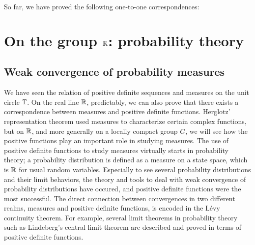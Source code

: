 \documentclass[12pt]{article}
\begin{document}
So far, we have proved the following one-to-one correspondences:
\begin{figure}[h]
\end{figure}










\newpage
\section{On the group $\mathbb{R}$: probability theory}

\subsection{Weak convergence of probability measures}

We have seen the relation of positive definite sequences and measures on the unit circle $\mathbb{T}$.
On the real line $\mathbb{R}$, predictably, we can also prove that there exists a correspondence between measures and positive definite functions.
Herglotz' representation theorem used measures to characterize certain complex functions, but on $\mathbb{R}$, and more generally on a locally compact group $G$, we will see how the positive functions play an important role in studying measures.
The use of positive definite functions to study measures virtually starts in probability theory; a probability distribution is defined as a measure on a state space, which is $\mathbb{R}$ for usual random variables.
Especially to see several probability distributions and their limit behaviors, the theory and tools to deal with weak convergence of probability distributions have occured, and positive definite functions were the most successful.
The direct connection between convergences in two different realms, measures and positive definite functions, is encoded in the L\'evy continuity theorem.
For example, several limit theorems in probability theory such as Lindeberg's central limit theorem are described and proved in terms of positive definite functions.
\end{document}
